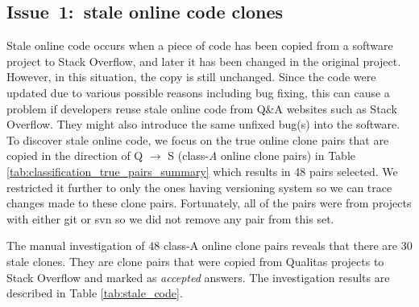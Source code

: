 \documentclass{sig-alternate-05-2015}
\begin{document}
\subsection{Issue~1:~stale online code clones}
Stale online code occurs when a piece of code has been copied from a software project to Stack Overflow, and later it has been changed in the original project. However, in this situation, the copy is still unchanged. Since the code were updated due to various possible reasons including bug fixing, this can cause a problem if developers reuse stale online code from Q\&A websites such as Stack Overflow. They might also introduce the same unfixed bug(s) into the software. To discover stale online code, we focus on the true online clone pairs that are copied in the direction of Q $\rightarrow$ S (class-\textit{A} online clone pairs) in Table \ref{tab:classification_true_pairs_summary} which results in 48 pairs selected. We restricted it further to only the ones having versioning system so we can trace changes made to these clone pairs. Fortunately, all of the pairs were from projects with either git or svn so we did not remove any pair from this set. 



The manual investigation of 48 class-A online clone pairs reveals that there are 30 stale clones. They are clone pairs that were copied from Qualitas projects to Stack Overflow and marked as \textit{accepted} answers.  The investigation results are described in Table \ref{tab:stale_code}.
\end{document}

